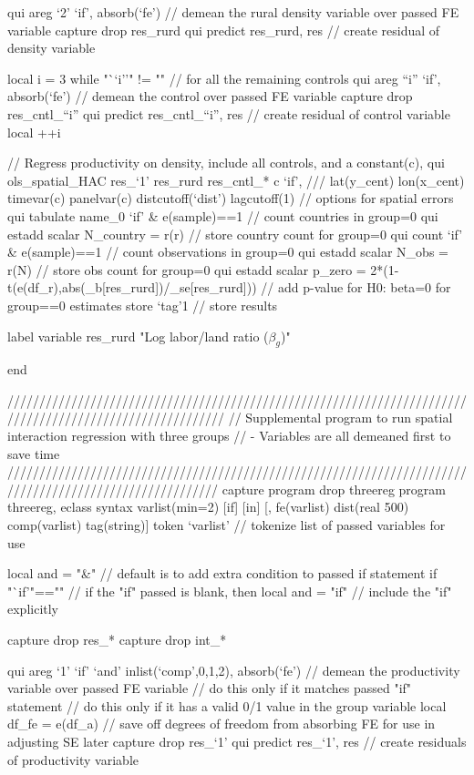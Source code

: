 	qui areg `2' `if', absorb(`fe') // demean the rural density variable over passed FE variable
	capture drop res_rurd
	qui predict res_rurd, res // create residual of density variable
	
	local i = 3 
	while "``i''" != "" { // for all the remaining controls
		qui areg ``i'' `if', absorb(`fe') // demean the control over passed FE variable
		capture drop res_cntl_``i''
		qui predict res_cntl_``i'', res // create residual of control variable
		local ++i
	}

	// Regress productivity on density, include all controls, and a constant(c), 
	qui ols_spatial_HAC res_`1' res_rurd res_cntl_*  c `if', ///
			lat(y_cent) lon(x_cent) timevar(c) panelvar(c) distcutoff(`dist') lagcutoff(1)	// options for spatial errors
	qui tabulate name_0 `if' & e(sample)==1 // count countries in group=0
	qui estadd scalar N_country = r(r) // store country count for group=0
	qui count `if' & e(sample)==1 // count observations in group=0
	qui estadd scalar N_obs = r(N) // store obs count for group=0
	qui estadd scalar p_zero = 2*(1-t(e(df_r),abs(_b[res_rurd])/_se[res_rurd])) // add p-value for H0: beta=0 for group==0		
	estimates store `tag'1 // store results
	
	label variable res_rurd "Log labor/land ratio ($\beta_g$)"

end 

//////////////////////////////////////////////////////////////////////////////////////////////////////////
// Supplemental program to run spatial interaction regression with three groups
// - Variables are all demeaned first to save time
/////////////////////////////////////////////////////////////////////////////////////////////////////////
capture program drop threereg
program threereg, eclass
	syntax varlist(min=2) [if] [in] [, fe(varlist) dist(real 500) comp(varlist) tag(string)] 
	token `varlist' // tokenize list of passed variables for use
	
	local and = "&" // default is to add extra condition to passed if statement
	if "`if'"=="" { // if the "if" passed is blank, then
		local and = "if" // include the "if" explicitly
	}

	capture drop res_*
	capture drop int_*

	qui areg `1' `if' `and' inlist(`comp',0,1,2), absorb(`fe') // demean the productivity variable over passed FE variable
		// do this only if it matches passed "if" statement
		// do this only if it has a valid 0/1 value in the group variable
	local df_fe = e(df_a) // save off degrees of freedom from absorbing FE for use in adjusting SE later
	capture drop res_`1'
	qui predict res_`1', res // create residuals of productivity variable
	
